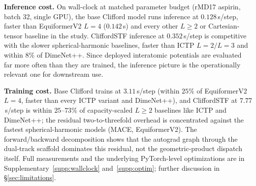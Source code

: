 \textbf{Inference cost.} On wall-clock at matched parameter budget (rMD17 aspirin, batch 32, single GPU), the base Clifford model runs inference at $0.128$\,s/step, faster than EquiformerV2 $L{=}4$ ($0.142$\,s) and every other $L\!\geq\!2$ or Cartesian-tensor baseline in the study. CliffordSTF inference at $0.352$\,s/step is competitive with the slower spherical-harmonic baselines, faster than ICTP $L{=}2/L{=}3$ and within $8\%$ of DimeNet++. Since deployed interatomic potentials are evaluated far more often than they are trained, the inference picture is the operationally relevant one for downstream use.

\textbf{Training cost.} Base Clifford trains at $3.11$\,s/step (within $25\%$ of EquiformerV2 $L{=}4$, faster than every ICTP variant and DimeNet++), and CliffordSTF at $7.77$\,s/step is within $25$--$73\%$ of capacity-scaled $L\!\geq\!2$ baselines like ICTP and DimeNet++; the residual two-to-threefold overhead is concentrated against the fastest spherical-harmonic models (MACE, EquiformerV2). The forward/backward decomposition shows that the autograd graph through the dual-track scaffold dominates this residual, not the geometric-product dispatch itself. Full measurements and the underlying PyTorch-level \citep{paszke2019pytorch} optimizations are in Supplementary~\ref{supp:wallclock} and~\ref{supp:optim}; further discussion in \S\ref{sec:limitations}.
